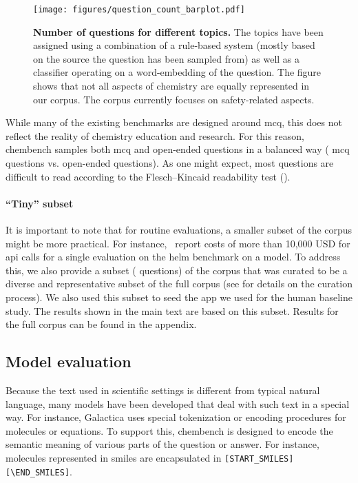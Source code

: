 \documentclass[11pt, oneside]{article}
\begin{document}
\begin{figure}
    \centering
    \texttt{[image: figures/question\_count\_barplot.pdf]}
    \caption{\textbf{Number of questions for different topics.} The topics have been assigned using a combination of a rule-based system (mostly based on the source the question has been sampled from) as well as a classifier operating on a word-embedding of the question. 
    The figure shows that not all aspects of chemistry are equally represented in our corpus. The corpus currently focuses on safety-related aspects.}
    \label{fig:topic_barplot}
\end{figure}

While many of the existing benchmarks are designed around \gls{mcq}, this does not reflect the reality of chemistry education and research.
For this reason, chembench samples both \gls{mcq} and open-ended questions in a balanced way ( \gls{mcq} questions vs.  open-ended questions).
As one might expect, most questions are difficult to read according to the Flesch–Kincaid readability test ().\cite{kincaid1975derivation}


\paragraph{\enquote{Tiny} subset}
It is important to note that for routine evaluations, a smaller subset of the corpus might be more practical.\cite{polo2024tinybenchmarks}
For instance,~\citet{liang2023holistic} report costs of more than 10,000 USD for \gls{api} calls for a single evaluation on the \gls{helm} benchmark on a model. 
To address this, we also provide a subset ( questions) of the corpus that was curated to be a diverse and representative subset of the full corpus (see  for details on the curation process).
We also used this subset to seed the app we used for the human baseline study. The results shown in the main text are based on this subset. 
Results for the full corpus can be found in the appendix.


\subsection{Model evaluation}

Because the text used in scientific settings is different from typical natural language, many models have been developed that deal with such text in a special way.
For instance, Galactica\cite{taylor2022galactica} uses special tokenization or encoding procedures for molecules or equations.
To support this, chembench is designed to encode the semantic meaning of various parts of the question or answer.  
For instance, molecules represented in \gls{smiles} are encapsulated in \texttt{[START\_SMILES][\textbackslash END\_SMILES]}.
\end{document}
